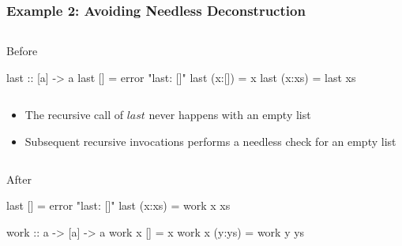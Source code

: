 \documentclass[smaller]{beamer}
\newcommand{\Varid}[1]{\mathit{#1}}
\begin{document}
\begin{frame}[fragile]
\frametitle{Example 2: Avoiding Needless Deconstruction}

\begin{columns}[t] 
\begin{column}{0.8\textwidth}
\begin{block}{Before}
{\footnotesize\begin{semiverbatim}
\alert{last       :: [a] -> a}
last []       = error "last: []"
last (x:[])   = x
last (x:xs)   = last xs
\end{semiverbatim}}
\end{block}
\end{column}
\end{columns}

\vskip 0.2in
\begin{itemize}
\item The recursive call of \ensuremath{\Varid{last}} never happens with an empty list
\item Subsequent recursive invocations performs a needless check for an empty list 
\end{itemize}
\begin{columns}[t] 
\begin{column}{0.8\textwidth}
\begin{block}{After}
{\footnotesize\begin{semiverbatim}
last []     = error "last: []"
last (x:xs) = work x xs

\alert{work :: a -> [a] -> a}
work x []     = x
work x (y:ys) = work y ys
\end{semiverbatim}}
\end{block}
\end{column}
\end{columns}

\end{frame}
\end{document}

